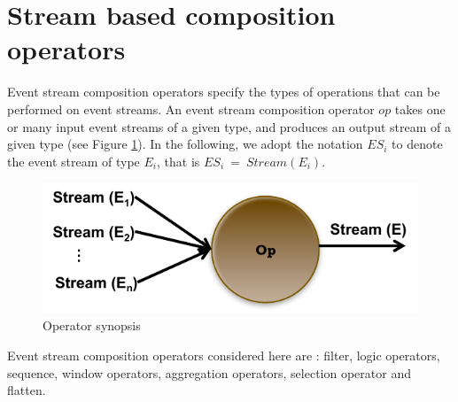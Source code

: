  \section{Stream based composition operators}
 \label{ch3:sec3}
 Event stream composition operators specify the types of operations that can be performed on event streams. An event stream composition operator $op$ takes one or many input event streams of a given type, and produces an output stream of a given type (see Figure \ref{fig:op}). In the following, we  adopt the notation $ES_i$ to denote the event stream of type $E_i$, that is $ES_i\ =\ Stream(E_i)$. 
 \begin{figure}[H]
  \begin{center}
    \includegraphics[scale=0.65]{chap3/images/op.pdf}
  \end{center}
  \caption{Operator synopsis}
  \label{fig:op}
\end{figure}
Event stream composition operators considered here are : filter, logic operators, sequence, window operators, aggregation operators, selection operator and flatten.  
